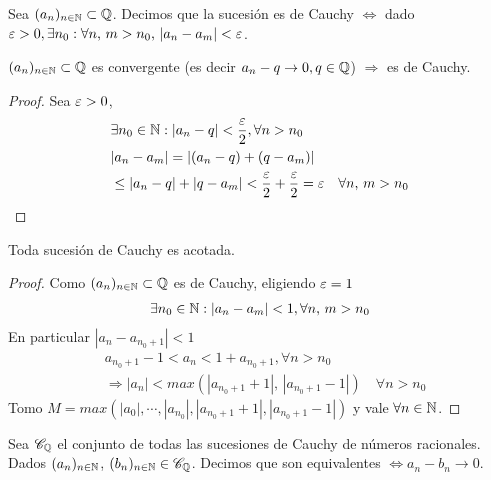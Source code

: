 \begin{definition}
  Sea $(a_n)_{n \in \mathbb{N}} \subset \mathbb{Q}$. Decimos que la sucesión es de Cauchy $\iff$ dado $\varepsilon > 0, \exists n_0 : \forall n\text{, }m > n_0\text{, } |a_n - a_m| < \varepsilon$.
\end{definition}

\begin{theorem}
  $(a_n)_{n \in \mathbb{N}} \subset \mathbb{Q}$ es convergente (es decir $a_n - q \to 0, q \in \mathbb{Q}$) $\Rightarrow$ es de Cauchy.
  \begin{proof}
    Sea $\varepsilon > 0$,
    \begin{align*}
       & \exists n_0 \in \mathbb{N} : |a_n - q| < \dfrac{\varepsilon}{2}, \forall n > n_0                                 \\
       & | a_n - a_m| = |(a_n - q) + (q - a_m)|                                                          \\
       & \leq |a_n - q| + |q - a_m| < \dfrac{\varepsilon}{2} + \dfrac{\varepsilon}{2} = \varepsilon \quad \forall n\text{, }m > n_0
    \end{align*}
  \end{proof}
\end{theorem}

\begin{theorem}
  Toda sucesión de Cauchy es acotada.
  \begin{proof}
    Como $(a_n)_{n \in \mathbb{N}} \subset \mathbb{Q}$ es de Cauchy, eligiendo $\varepsilon = 1$ \begin{align*}
      \exists n_0 \in \mathbb{N} : |a_n - a_m| < 1, \forall n\text{, }m > n_0
    \end{align*}
    En particular $|a_n - a_{n_0+1}| < 1$
    \begin{align*}
       & a_{n_0+1} - 1 < a_n < 1 + a_{n_0+1}, \forall n > n_0                                    \\
       & \Rightarrow |a_n| < max(|a_{n_0+1} + 1|\text{, } |a_{n_0+1} - 1|) \quad \forall n > n_0
    \end{align*}
    Tomo $M = max(|a_0|, \cdots, |a_{n_0}|, |a_{n_0+1} + 1|, |a_{n_0+1} - 1|)$ y vale $\forall n \in \mathbb{N}$.
  \end{proof}
\end{theorem}

\begin{definition}
  Sea $\mathscr{C}_{\mathbb{Q}}$ el conjunto de todas las sucesiones de Cauchy de números racionales. Dados $(a_n)_{n \in \mathbb{N}}$, $(b_n)_{n \in \mathbb{N}} \in \mathscr{C}_{\mathbb{Q}}$. Decimos que son equivalentes $\iff a_n - b_n \to 0$.
\end{definition}

